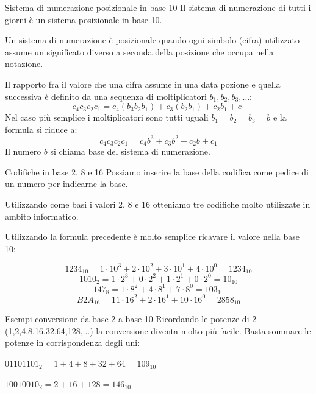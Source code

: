 \documentclass[9pt, format=169]{beamer}
\begin{document}
\begin{frame}{Sistema di numerazione posizionale in base 10}
Il sistema di numerazione di tutti i giorni è un sistema \alert{posizionale} in \alert{base 10}.

Un sistema di numerazione è \alert{posizionale} quando ogni simbolo (cifra) utilizzato assume un significato diverso a seconda della posizione che occupa nella notazione.

Il rapporto fra il valore che una cifra assume in una data pozione e quella successiva è definito da una sequenza di moltiplicatori $b_1, b_2, b_3, \dots$:
\[c_4c_3c_2c_1 = c_4(b_3b_2b_1) + c_3(b_2b_1) + c_2b_1 + c_1\]
\pause
Nel caso più semplice i moltiplicatori sono tutti uguali $b_1 = b_2 = b_3 = b$ e la formula si riduce a:
\[c_4c_3c_2c_1 = c_4b^3 + c_3b^2 + c_2b + c_1\]
Il numero $b$ si chiama \alert{base} del sistema di numerazione.
\end{frame}

\begin{frame}{Codifiche in base 2, 8 e 16}
Possiamo inserire la base della codifica come pedice di un numero per indicarne la base.

Utilizzando come basi i valori 2, 8 e 16 otteniamo tre codifiche molto utilizzate in ambito informatico.

Utilizzando la formula precedente è molto semplice ricavare il valore nella base 10:

\[1234_{10} = 1\cdot10^3 + 2\cdot10^2 + 3\cdot10^1 + 4\cdot10^0 = 1234_{10}\]
\pause
\[1010_{2}  = 1\cdot2^3  + 0\cdot2^2  + 1\cdot2^1  + 0\cdot2^0 = 10_{10}\]
\pause
\[147_8 = 1\cdot8^2 + 4\cdot8^1 + 7\cdot8^0 = 103_{10}\]
\pause
\[B2A_{16} = 11\cdot16^2 + 2\cdot16^1 + 10\cdot16^0 = 2858_{10}\]
\end{frame}

\begin{frame}{Esempi conversione da base 2 a base 10}
Ricordando le potenze di 2 (1,2,4,8,16,32,64,128,...) la conversione diventa molto più facile. Basta sommare le potenze in corrispondenza degli uni:

$01101101_2 = 1+4+8+32+64 = 109_{10}$

$10010010_2 = 2+16+128 = 146_{10}$
\end{frame}
\end{document}
